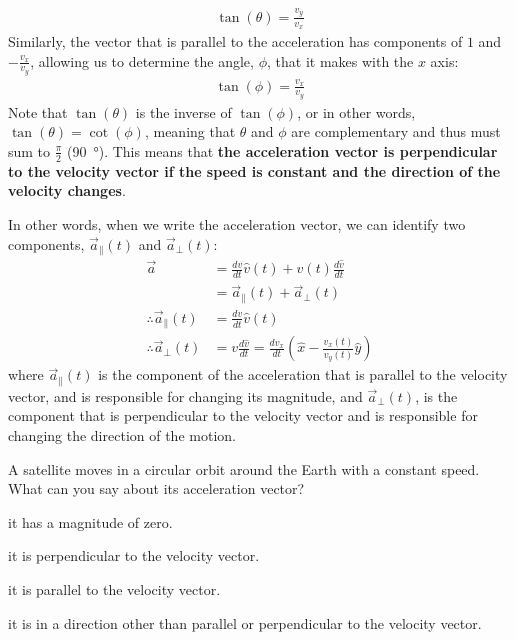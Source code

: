 \begin{align*}
\tan(\theta)=\frac{v_y}{v_x}
\end{align*}
Similarly, the vector that is parallel to the acceleration has components of $1$ and $-\frac{v_x}{v_y}$, allowing us to determine the angle, $\phi$, that it makes with the $x$ axis:
\begin{align*}
\tan(\phi)=\frac{v_x}{v_y}
\end{align*}
Note that $\tan(\theta)$ is the inverse of $\tan(\phi)$, or in other words, $\tan(\theta)=\cot(\phi)$, meaning that $\theta$ and $\phi$ are complementary and thus must sum to $\frac{\pi}{2}$ (\SI{90}{\degree}). This means that \textbf{the acceleration vector is perpendicular to the velocity vector if the speed is constant and the direction of the velocity changes}. 

In other words, when we write the acceleration vector, we can identify two components, $\vec a_{\parallel}(t)$ and $\vec a_{\perp}(t)$:
\begin{align*}
\vec a&=\frac{dv}{dt}\hat v(t)+v(t)\frac{d\hat v}{dt}\\
&=\vec a_{\parallel}(t) + \vec a_{\perp}(t)\\
\therefore \vec a_{\parallel}(t)&=\frac{dv}{dt}\hat v(t)\\
\therefore \vec a_{\perp}(t)&=v\frac{d\hat v}{dt}=\frac{dv_x}{dt} \left(\hat x - \frac{v_x(t)}{v_y(t)}\hat y\right)
\end{align*}
where $\vec a_{\parallel}(t)$ is the component of the acceleration that is parallel to the velocity vector, and is responsible for changing its magnitude, and $\vec a_{\perp}(t)$, is the component that is perpendicular to the velocity vector and is responsible for changing the direction of the motion.

\begin{checkpointMC}{A satellite moves in a circular orbit around the Earth with a constant speed. What can you say about its acceleration vector?}
\item it has a magnitude of zero.
\item it is perpendicular to the velocity vector.
\item it is parallel to the velocity vector.
\item it is in a direction other than parallel or perpendicular to the velocity vector.
\end{checkpointMC}

